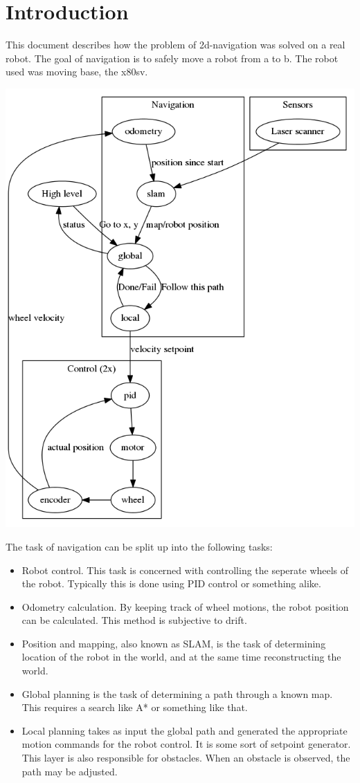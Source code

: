 \documentclass[a4paper]{article}
\begin{document}
\section{Introduction}
This document describes how the problem of 2d-navigation was solved on a real robot.
The goal of navigation is to safely move a robot from a to b. The robot used
was moving base, the x80sv.


\includegraphics[width=\textwidth,height=\textheight,keepaspectratio]{img/overview.png}

The task of navigation can be split up into the following tasks:

\begin{itemize}
  \item Robot control. This task is concerned with controlling the seperate wheels of the robot. Typically this is done using PID control or something alike.
  \item Odometry calculation. By keeping track of wheel motions, the robot position can be
calculated. This method is subjective to drift.
  \item Position and mapping, also known as SLAM, is the task of determining location of the robot in the world, and at the same time reconstructing the world.
  \item Global planning is the task of determining a path through a known map. This requires a search like A* or something like that.
  \item Local planning takes as input the global path and generated the appropriate motion commands for the robot control. It is some sort of setpoint generator. This layer is also responsible for obstacles. When an obstacle is observed, the path may be adjusted.
\end{itemize}
\end{document}
